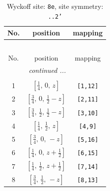 \documentclass[fleqn,8pt]{jsarticle}
\begin{document}
\begin{longtable}{ccc}
\caption{Wyckoff site: {\tt 8e}, site symmetry: {\tt ..2'}}
 \\
 \hline \hline
No. & position & mapping \\ \hline \endfirsthead

\multicolumn{2}{l}{\tablename\ \thetable{}} \\
 \hline \hline
No. & position & mapping \\ \hline \endhead

 \hline \hline
\multicolumn{2}{r}{\footnotesize\it continued ...} \\ \endfoot

 \hline \hline
\multicolumn{2}{r}{} \\ \endlastfoot

1 & $\left[ \frac{1}{4},\, 0,\, z \right]$ & {\tt [1,12]} \\ \hline
2 & $\left[ \frac{3}{4},\, 0,\, \frac{1}{2} - z \right]$ & {\tt [2,11]} \\ \hline
3 & $\left[ \frac{3}{4},\, \frac{1}{2},\, \frac{1}{2} - z \right]$ & {\tt [3,10]} \\ \hline
4 & $\left[ \frac{1}{4},\, \frac{1}{2},\, z \right]$ & {\tt [4,9]} \\ \hline
5 & $\left[ \frac{3}{4},\, 0,\, - z \right]$ & {\tt [5,16]} \\ \hline
6 & $\left[ \frac{1}{4},\, 0,\, z + \frac{1}{2} \right]$ & {\tt [6,15]} \\ \hline
7 & $\left[ \frac{1}{4},\, \frac{1}{2},\, z + \frac{1}{2} \right]$ & {\tt [7,14]} \\ \hline
8 & $\left[ \frac{3}{4},\, \frac{1}{2},\, - z \right]$ & {\tt [8,13]} \\
\end{longtable}
\renewcommand{\arraystretch}{1.2}
\end{document}

